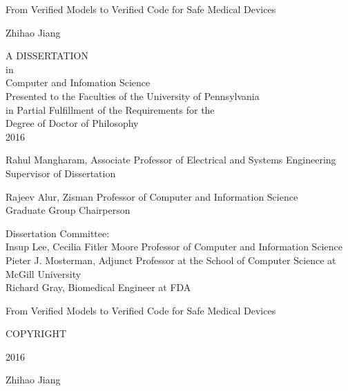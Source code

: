 \documentclass[12pt,letterpaper]{report}
\theoremstyle{definition}
\theoremstyle{remark}
\numberwithin{equation}{chapter}
\theoremstyle{plain} %
\def\thetitle{From Verified Models to Verified Code for Safe Medical Devices}
\def\theauthor{Zhihao Jiang}
\def\theyear{2016}
\begin{document}

\newpage
{}
{}
\thispagestyle{empty}
\vspace*{\fill}
\begin{center}
\thetitle

\vspace*{0.3in}
\theauthor

\vspace*{0.3in}
A DISSERTATION\\
$ $\\
in \\
$ $\\
Computer and Infomation Science\\
$ $\\
Presented to the Faculties of the University of Pennsylvania\\
in Partial Fulfillment of the Requirements for the\\
Degree of Doctor of Philosophy\\
$ $\\
\theyear
\end{center}

\vspace{0.6 in}
\noindent\makebox[0in][l]{\rule[2ex]{3in}{.3mm}}
Rahul Mangharam, Associate Professor of Electrical and Systems Engineering\\Supervisor of Dissertation

\vspace*{0.6 in}
\noindent\makebox[0in][l]{\rule[2ex]{3in}{.3mm}}
Rajeev Alur, Zisman Professor of Computer and Information Science\\Graduate Group Chairperson

\vspace*{0.2in}
\noindent Dissertation Committee:\\
Insup Lee, Cecilia Fitler Moore Professor of Computer and Information Science\\
Pieter J. Mosterman, Adjunct Professor at the School of Computer Science at McGill University\\
Richard Gray, Biomedical Engineer at FDA
\vspace*{\fill}




\newpage
\thispagestyle{empty}
\vspace*{\fill}
\begin{center}
From Verified Models to Verified Code for Safe Medical Devices

\vspace*{0.6 in}
COPYRIGHT

\vspace*{0.6 in}
\theyear

\vspace*{0.6 in}
\theauthor
\end{center}
\vspace*{\fill}
\end{document}
